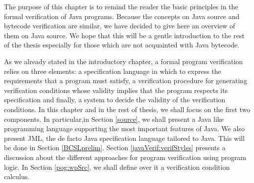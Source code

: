 The purpose of this chapter is to remind the reader the basic principles in the formal verification  
of Java programs. Because the concepts on Java source and bytecode verification are similar, we have decided   
to give here an overview of them on Java source. We hope that this will be a gentle
 introduction to the rest of the thesis especially for  those
which are not acquainted with Java bytecode.

 As we already stated in the introductory chapter, a formal program verification
relies on three elements: a specification language in which to express the requirements 
that a program must satisfy, a verification procedure for generating verification conditions
whose validity implies that the program respects its specification and finally,
 a system to decide the validity of the verification conditions.
In this chapter and in the rest of thesis, we shall focus on the first two components. 
In particular,in Section \ref{source}, we shall present a Java like programming language supporting the most important features of Java.
 We also present JML, the de facto Java specification language  tailored to Java. This will be done in Section \ref{BCSLprelim}. 
Section \ref{javaVerif:verifStyles} presents a discussion about  the different approaches for program verification using program logic.
In Section \ref{pog:wpSrc}, we shall define over it a  verification condition calculus.
